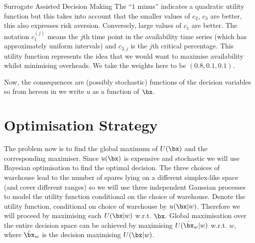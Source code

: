 \begin{chapter}{Surrogate Assisted Decision Making \label{Chap:optimisation}}
The ``$1$ minus'' indicates a quadratic utility function but this takes into account that the smaller values of $c_2$, $c_3$ are better, this also expresses risk aversion. Conversely, large values of $c_1$ are better. The notation $c_1^{(j)}$ means the $j$th time point in the availability time series (which has approximately uniform intervals) and $c_{3,j}$ is the $j$th critical percentage. This utility function represents the idea that we would want to maximise availability whilst minimising overheads. We take the weights here to be $(0.8,0.1,0.1)$.




Now, the consequences are (possibly stochastic) functions of the decision variables so from hereon in we write $u$ as a function of $\bx$.

\section{Optimisation Strategy}

The problem now is to find the global maximum of $U(\bx)$ and the corresponding maximiser. Since $u(\bx)$ is expensive and stochastic we will use Bayesian optimisation to find the optimal decision. The three choices of warehouse lead to the number of spares lying on a different simplex-like space (and cover different ranges) so we will use three independent Gaussian processes to model the utility function conditional on the choice of warehouse. Denote the utility function, conditional on choice of warehouse by $u(\bx|w)$. Therefore we will proceed by maximising each $U(\bx|w)$ w.r.t. $\bx$. Global maximisation over the entire decision space can be achieved by maximising $U(\hat{\bx}_w|w)$ w.r.t. $w$, where $\hat{\bx}_w$ is the decision maximising $U(\bx|w)$.


\end{chapter}
